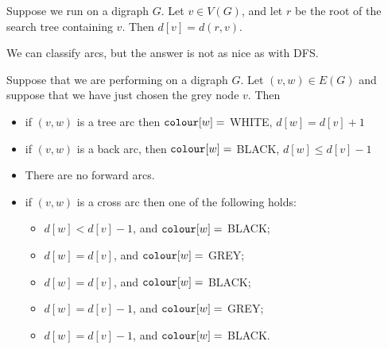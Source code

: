 \begin{Theorem}
\label{thm:BFSdist}
Suppose we run  on a digraph $G$.
Let $v\in V(G)$, and let $r$ be the root of the search tree containing $v$. 
Then $d[v] = d(r, v)$.
\end{Theorem}


We can classify arcs, but the answer is not as nice as with DFS.

\begin{Theorem}
\label{thm:BFS-arcclass}
Suppose that we are performing  on a digraph $G$. Let $(v,
w)\in E(G)$ and suppose that we have just chosen the grey node $v$. 
Then
\begin{itemize}
\item
if $(v, w)$ is a tree arc then $\colour[w] = $ WHITE, $d[w] = d[v] + 1$
\item
if $(v, w)$ is a back arc, then $\colour[w] = $ BLACK, $d[w] \leq d[v] - 1$  
\item
There are no forward arcs.
\item
if $(v, w)$ is a cross arc then one of the following holds:
\begin{itemize}
\item $d[w] < d[v] - 1$, and $\colour[w] = $ BLACK;
\item $d[w] = d[v]$, and $\colour[w] = $ GREY;
\item $d[w] = d[v]$, and $\colour[w] = $ BLACK;
\item $d[w] = d[v] - 1$, and $\colour[w] = $ GREY;
\item $d[w] = d[v] - 1$, and $\colour[w] = $ BLACK.
\end{itemize}
\end{itemize}
\end{Theorem}

